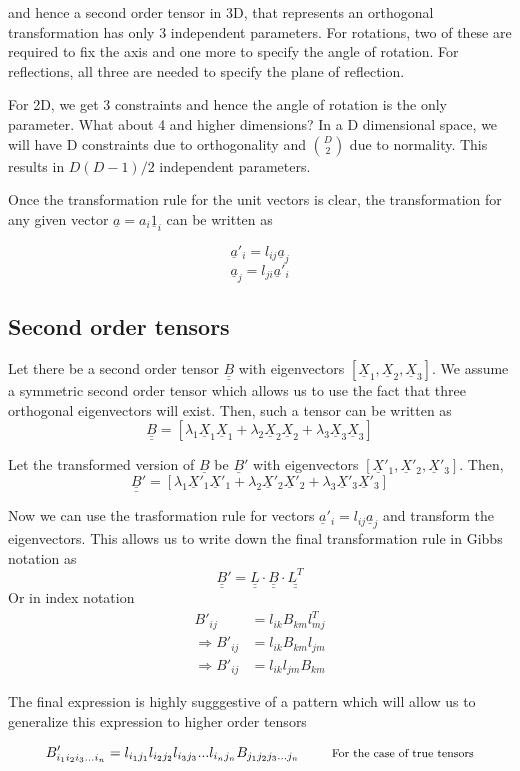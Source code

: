\documentclass[11pt, letterpaper]{article}
\newcommand{\1}{\bm{1}}
\newcommand{\uu}[1]{\underline{\underline{#1}}}
\newcommand{\un}[1]{\underline{#1}}
\begin{document}
and hence a second order tensor in 3D, that represents an orthogonal transformation has only 3 independent parameters. For rotations, two of these are required to fix the axis and one more to specify the angle of rotation. For reflections, all three are needed to specify the plane of reflection. 


For 2D, we get 3 constraints and hence the angle of rotation is the only parameter. What about 4 and higher dimensions? In a D dimensional space, we will have D constraints due to orthogonality and ${D\choose 2}$ due to normality. This results in $D(D-1)/2$ independent parameters.

Once the transformation rule for the unit vectors is clear, the transformation for any given vector $\un{a} = a_i\un{1}_i$ can be written as

$$\un{a}'_i= l_{ij}\un{a}_j$$
$$\un{a}_j = l_{ji}\un{a}'_i$$

\subsection{Second order tensors}

Let there be a second order tensor $\uu{B}$ with eigenvectors $[\un{X}_1,\un{X}_2,\un{X}_3]$. We assume a symmetric second order tensor which allows us to use the fact that three orthogonal eigenvectors will exist. Then, such a tensor can be written as
$$\uu{B}=[\lambda_1\un{X}_1\un{X}_1+\lambda_2\un{X}_2\un{X}_2+\lambda_3\un{X}_3\un{X}_3]$$

Let the transformed version of $\un{B}$ be $\un{B}'$ with eigenvectors $[\un{X}'_1,\un{X}'_2,\un{X}'_3]$. Then,
$$\uu{B}'=[\lambda_1\un{X}'_1\un{X}'_1+\lambda_2\un{X}'_2\un{X}'_2+\lambda_3\un{X}'_3\un{X}'_3]$$

Now we can use the trasformation rule for vectors $\un{a}'_i= l_{ij}\un{a}_j$ and transform the eigenvectors. This allows us to write down the final transformation rule in Gibbs notation as
$$\uu{B}'=\uu{L}\cdot\uu{B}\cdot\uu{L^T}$$
Or in index notation
\begin{align*}
B'_{ij} &= l_{ik}B_{km}l^T_{mj}\\
\Rightarrow B'_{ij} &= l_{ik}B_{km}l_{jm}\\
\Rightarrow B'_{ij} &= l_{ik}l_{jm}B_{km}
\end{align*}

The final expression is highly sugggestive of a pattern which will allow us to generalize this expression to higher order tensors

$$B'_{i_1i_2i_3...i_n} = l_{i_1j_1}l_{i_2j_2}l_{i_3j_3}...l_{i_nj_n}B_{j_1j_2j_3...j_n} \text{ \quad \quad \footnotesize{For the case of true tensors}}$$
\end{document}

